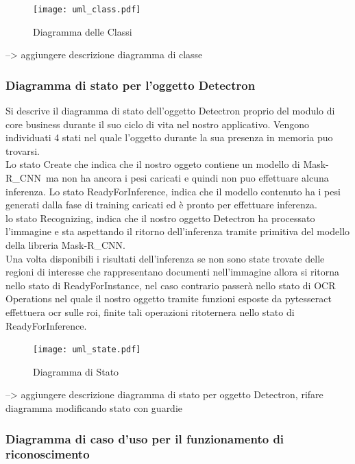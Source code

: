 \documentclass[12pt,a4paper]{article}
\newcommand{\mrcnn}{Mask-R\_CNN}
\begin{document}
\begin{figure}[p]
    \caption{Diagramma delle Classi}
    \centering
    \texttt{[image: uml\_class.pdf]}
\end{figure}

--> aggiungere descrizione diagramma di classe

\subsubsection{Diagramma di stato per l'oggetto Detectron}

Si descrive il diagramma di stato dell'oggetto Detectron proprio del
modulo di core business durante il suo ciclo di vita  nel nostro
applicativo.
Vengono individuati 4 stati nel quale l'oggetto durante la sua presenza
in memoria puo trovarsi.\\
Lo stato Create che indica che il nostro oggeto contiene un modello di
\mrcnn\ ma non ha ancora i pesi caricati e quindi non puo effettuare
alcuna inferenza.
Lo stato ReadyForInference, indica che il modello contenuto ha i pesi
generati dalla fase di training caricati ed è pronto per effettuare
inferenza.\\
lo stato Recognizing, indica che il nostro oggetto Detectron ha
processato l'immagine e sta aspettando il ritorno dell'inferenza tramite
primitiva del modello della libreria \mrcnn.\\
Una volta disponibili i risultati dell'inferenza se non sono state trovate
delle regioni di interesse che rappresentano documenti nell'immagine
allora si ritorna nello stato di ReadyForInstance, nel caso contrario
passerà nello stato di OCR Operations nel quale il nostro oggetto
tramite funzioni esposte da pytesseract effettuera ocr sulle roi, finite
tali operazioni ritoternera nello stato di ReadyForInference.\\

\begin{figure}[p]
    \caption{Diagramma di Stato}
    \centering
    \texttt{[image: uml\_state.pdf]}
\end{figure}

--> aggiungere descrizione diagramma di stato per oggetto
Detectron, rifare diagramma modificando stato con guardie

\subsubsection{Diagramma di caso d'uso per il funzionamento di
riconoscimento}
\end{document}
